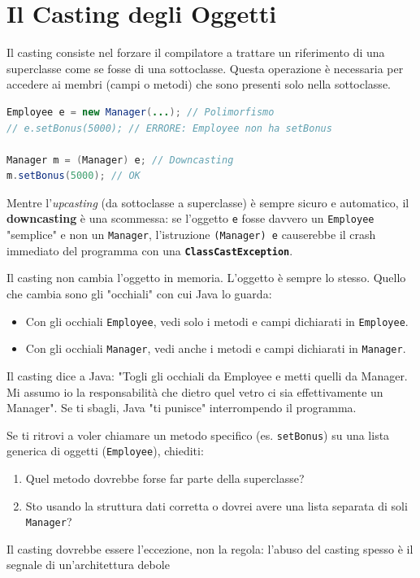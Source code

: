 \section{Il Casting degli Oggetti}

Il casting consiste nel forzare il compilatore a trattare un riferimento di una superclasse come se fosse di una sottoclasse. Questa operazione è necessaria per accedere ai membri (campi o metodi) che sono presenti solo nella sottoclasse.

\begin{lstlisting}[language=Java, caption={Esempio di Downcasting}]
Employee e = new Manager(...); // Polimorfismo
// e.setBonus(5000); // ERRORE: Employee non ha setBonus

Manager m = (Manager) e; // Downcasting
m.setBonus(5000); // OK
\end{lstlisting}

Mentre l'\textit{upcasting} (da sottoclasse a superclasse) è sempre sicuro e automatico, il \textbf{downcasting} è una scommessa: se l'oggetto \texttt{e} fosse davvero un \texttt{Employee} "semplice" e non un \texttt{Manager}, l'istruzione \texttt{(Manager) e} causerebbe il crash immediato del programma con una \textbf{\texttt{ClassCastException}}.

Il casting non cambia l'oggetto in memoria. L'oggetto è sempre lo stesso. Quello che cambia sono gli "occhiali" con cui Java lo guarda:
\begin{itemize}
    \item Con gli occhiali \texttt{Employee}, vedi solo i metodi e campi dichiarati in \texttt{Employee}.
    \item Con gli occhiali \texttt{Manager}, vedi anche i metodi e campi dichiarati in \texttt{Manager}.
\end{itemize}

Il casting dice a Java: "Togli gli occhiali da Employee e metti quelli da Manager. Mi assumo io la responsabilità che dietro quel vetro ci sia effettivamente un Manager". Se ti sbagli, Java "ti punisce" interrompendo il programma.


\begin{tip}
    Se ti ritrovi a voler chiamare un metodo specifico (es. \texttt{setBonus}) su una lista generica di oggetti (\texttt{Employee}), chiediti:
    \begin{enumerate}
        \item Quel metodo dovrebbe forse far parte della superclasse?
        \item Sto usando la struttura dati corretta o dovrei avere una lista separata di soli \texttt{Manager}?
    \end{enumerate}
    Il casting dovrebbe essere l'eccezione, non la regola: l'abuso del casting spesso è il segnale di un'architettura debole
\end{tip}

